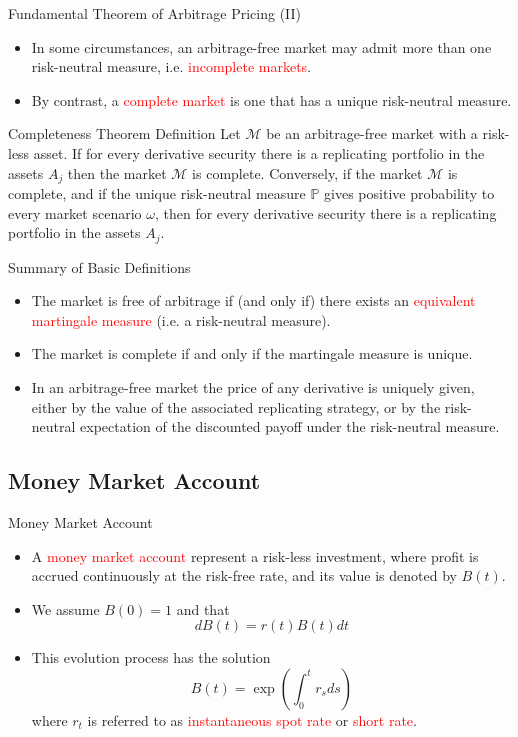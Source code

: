 \documentclass{beamer}
\begin{document}
\begin{frame}{Fundamental Theorem of Arbitrage Pricing (II)}
	\begin{itemize}
		\item In some circumstances, an arbitrage-free market may admit more than one risk-neutral measure, i.e. \textcolor{red}{incomplete markets}.
		\item By contrast, a \textcolor{red}{complete market} is one that has a unique risk-neutral measure.
	\end{itemize}
	\begin{block}{Completeness Theorem Definition}
		Let $\mathcal{M}$ be an arbitrage-free market with a risk-less asset. If for every derivative security there is a replicating portfolio in the assets $A_j$ then the market $\mathcal{M}$ is complete. Conversely, if the market $\mathcal{M}$ is complete, and if the unique risk-neutral measure $\mathbb{P}$ gives positive probability to every market scenario $\omega$, then for every
		derivative security there is a replicating portfolio in the assets $A_j$.
	\end{block}
\end{frame}

\begin{frame}{Summary of Basic Definitions}
	\begin{itemize}
		\item The market is free of arbitrage if (and only if) there exists an \textcolor{red}{equivalent martingale measure} (i.e. a risk-neutral measure).
		\item The market is complete if and only if the martingale measure is unique.
		\item In an arbitrage-free market the price of any derivative is uniquely given, either by the value of the associated replicating strategy, or by the risk-neutral expectation of the discounted payoff under the risk-neutral measure. 
	\end{itemize}
\end{frame}

\subsection{Money Market Account}
\begin{frame}{Money Market Account}
	\begin{itemize}
		\item A \textcolor{red}{money market account} represent a risk-less investment, where profit is accrued continuously at the risk-free rate, and its value is denoted by $B(t)$.
		\item We assume $B(0)=1$ and that 
		\begin{equation}
			dB(t) = r(t)B(t)dt
		\end{equation}
		\item This evolution process has the solution 
		\begin{equation}
			B(t) = \exp\left(\int_0^t r_s ds\right)
		\end{equation}
		where $r_t$ is referred to as \textcolor{red}{instantaneous spot rate} or  \textcolor{red}{short rate}.
	\end{itemize}
\end{frame}
\end{document}
